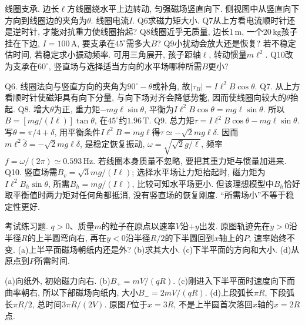 \begin{exercise}
线圈支承. 边长$\ell$方线圈绕水平上边转动, 匀强磁场竖直向下. 侧视图中从竖直向下方向到线圈边的夹角为$\theta$. 线圈电流$I$.
Q6求磁力矩大小.
Q7从上方看电流顺时针还是逆时针, 才能对抗重力使线圈抬起?
Q8线圈近乎无质量, 边长$1\,\mathrm m$, 一个$20\,\mathrm{kg}$孩子挂在下边, $I=100\,\mathrm A$, 要支承在$45^\circ$需多大$B$?
Q9小扰动会放大还是恢复? 若不稳定估时间, 若稳定求小振动频率. 可用三角展开, 孩子距轴$\ell$, 转动惯量$m\ell^2$.
Q10改为支承在$60^\circ$, 竖直场与选择适当方向的水平场哪种所需$B$更小?
\end{exercise}
\begin{solution}
Q6. 线圈法向与竖直方向的夹角为$90^\circ-\theta$或补角, 故$|\tau_B|=I\ell^2B\cos\theta$.
Q7. 从上方看顺时针使磁矩具有向下分量, 与向下场对齐会降低势能, 因而使线圈向较大的$\theta$抬起.
Q8. 增大$\theta$为正, 重力矩$-mg\ell\sin\theta$, 平衡为$I\ell^2B\cos\theta=mg\ell\sin\theta$. 所以$B=[mg/(I\ell)]\tan\theta$, 在$45^\circ$约$1.96\,\mathrm T$.
Q9. 总力矩$\tau=I\ell^2B\cos\theta-mg\ell\sin\theta$. 写$\theta=\pi/4+\delta$, 用平衡条件$I\ell^2B=mg\ell$得$\tau\simeq-\sqrt2mg\ell\delta$. 因而$m\ell^2\ddot\delta=-\sqrt2mg\ell\delta$, 是稳定恢复振动, $\omega=\sqrt{\sqrt2g/\ell}$, 频率$f=\omega/(2\pi)\simeq0.593\,\mathrm{Hz}$. 若线圈本身质量不忽略, 要把其重力矩与惯量加进来.
Q10. 竖直场需$B_v=\sqrt3mg/(I\ell)$; 选择水平场让力矩抬起时, 磁力矩为$I\ell^2B_h\sin\theta$, 所需$B_h=mg/(I\ell)$, 比较可知水平场更小. 但该理想模型中$B_h$恰好取平衡值时两力矩对任何角都抵消, 没有竖直场的恢复刚度. “所需场小”不等于稳定性更好.
\begin{center}\end{center}
\end{solution}

\begin{exercise}
考试练习题. $q>0$、质量$m$的粒子在原点以速率$V$沿$+y$出发. 原图轨迹先在$y>0$沿半径$R$的上半圆弯向右, 再在$y<0$沿半径$R/2$的下半圆回到$x$轴上的$P$, 速率始终不变.
(a)上半平面磁场朝纸内还是外?
(b)求其大小.
(c)下半平面的方向和大小.
(d)从原点到$P$所需时间.
\end{exercise}
\begin{solution}
(a)向纸外, 初始磁力向右. (b)$B_+=mV/(qR)$.
(c)刚进入下半平面时速度向下而曲率朝右, 所以下部磁场向纸内, 大小$B_-=2mV/(qR)$.
(d)上段弧长$\pi R$, 下段弧长$\pi R/2$, 总时间$3\pi R/(2V)$. 原图$P$位于$x=3R$, 不是上半圆首次落回$x$轴的$x=2R$点.
\end{solution}
